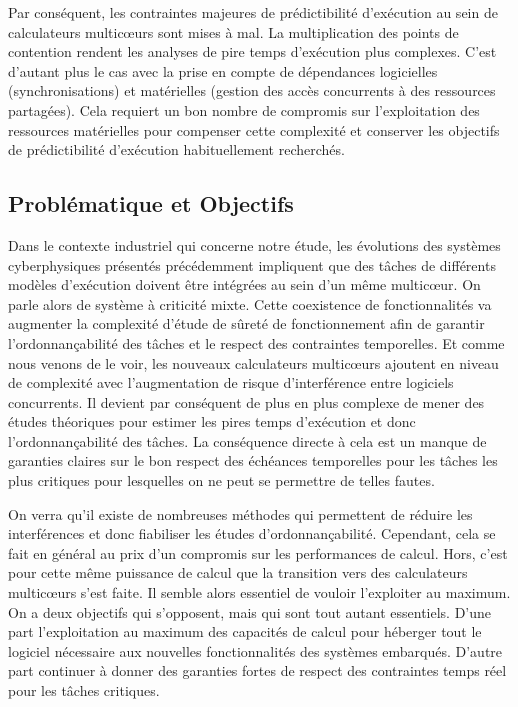\documentclass[french, a4paper, 11pt, twoside, pdftex]{StyleThese}
\begin{document}
	Par conséquent, les contraintes majeures de prédictibilité d'exécution au sein de calculateurs multicœurs sont mises à mal. La multiplication des points de contention rendent les analyses de pire temps d'exécution plus complexes. C'est d'autant plus le cas avec la prise en compte de dépendances logicielles (synchronisations) et matérielles (gestion des accès concurrents à des ressources partagées). Cela requiert un bon nombre de compromis sur l'exploitation des ressources matérielles pour compenser cette complexité et conserver les objectifs de prédictibilité d'exécution habituellement recherchés.

\subsection{Problématique et Objectifs}
		Dans le contexte industriel qui concerne notre étude, les évolutions des systèmes cyberphysiques présentés précédemment impliquent que des tâches de différents modèles d'exécution doivent être intégrées au sein d'un même multicœur. On parle alors de système à criticité mixte. Cette coexistence de fonctionnalités va augmenter la complexité d'étude de sûreté de fonctionnement afin de garantir l'ordonnançabilité des tâches et le respect des contraintes temporelles. Et comme nous venons de le voir, les nouveaux calculateurs multicœurs ajoutent en niveau de complexité avec l'augmentation de risque d'interférence entre logiciels concurrents. Il devient par conséquent de plus en plus complexe de mener des études théoriques pour estimer les pires temps d'exécution et donc l'ordonnançabilité des tâches. La conséquence directe à cela est un manque de garanties claires sur le bon respect des échéances temporelles pour les tâches les plus critiques pour lesquelles on ne peut se permettre de telles fautes.
		
		On verra qu'il existe de nombreuses méthodes qui permettent de réduire les interférences et donc fiabiliser les études d'ordonnançabilité. Cependant, cela se fait en général au prix d'un compromis sur les performances de calcul.
		Hors, c'est pour cette même puissance de calcul que la transition vers des calculateurs multicœurs s'est faite. Il semble alors essentiel de vouloir l'exploiter au maximum. On a deux objectifs qui s'opposent, mais qui sont tout autant essentiels. D'une part l'exploitation au maximum des capacités de calcul pour héberger tout le logiciel nécessaire aux nouvelles fonctionnalités des systèmes embarqués. D'autre part continuer à donner des garanties fortes de respect des contraintes temps réel pour les tâches critiques. 
		
\end{document}
